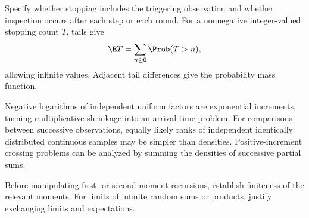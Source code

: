 Specify whether stopping includes the triggering observation and whether inspection occurs after each step or each round. For a nonnegative integer-valued stopping count $T$, tails give
\[
\E T=\sum_{n\ge0}\Prob(T>n),
\]
allowing infinite values. Adjacent tail differences give the probability mass function.

Negative logarithms of independent uniform factors are exponential increments, turning multiplicative shrinkage into an arrival-time problem. For comparisons between successive observations, equally likely ranks of independent identically distributed continuous samples may be simpler than densities. Positive-increment crossing problems can be analyzed by summing the densities of successive partial sums.

Before manipulating first- or second-moment recursions, establish finiteness of the relevant moments. For limits of infinite random sums or products, justify exchanging limits and expectations.
\par\smallskip

